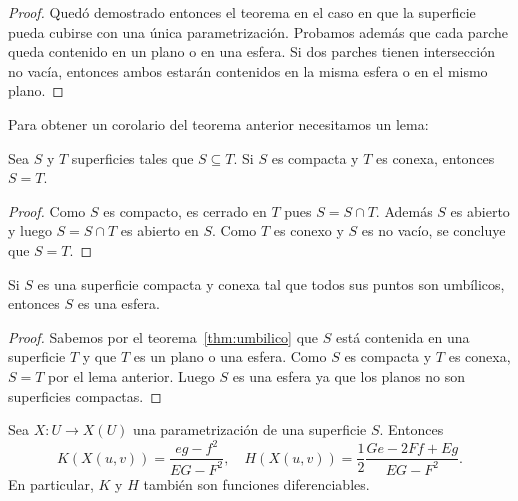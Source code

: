 \begin{proof}
	Quedó demostrado entonces el teorema en el caso en que la superficie pueda
	cubirse con una única parametrización. Probamos además que cada parche
	queda contenido en un plano o en una esfera. Si dos parches tienen
	intersección no vacía, entonces ambos estarán contenidos en la misma esfera
	o en el mismo plano. 
\end{proof}

Para obtener un corolario del teorema anterior
necesitamos un lema:

\begin{lemma}
	Sea $S$ y $T$ superficies tales que $S\subseteq T$. Si $S$ es compacta y
	$T$ es conexa, entonces $S=T$.
\end{lemma}

\begin{proof} 
	Como $S$ es compacto, es cerrado en $T$ pues $S=S\cap T$. Además
	$S$ es abierto y luego $S=S\cap T$ es abierto en $S$. Como $T$ es conexo y
	$S$ es no vacío, se concluye que $S=T$.
\end{proof}

\begin{theorem}
	\label{thm:es_esfera}
	Si $S$ es una superficie compacta y conexa tal que todos sus puntos son
	umbílicos, entonces $S$ es una esfera.	
\end{theorem}

\begin{proof}
	Sabemos por el teorema~\ref{thm:umbilico} que $S$ está contenida en una
	superficie $T$ y que $T$ es un plano o una esfera. Como $S$ es compacta y
	$T$ es conexa, $S=T$ por el lema anterior.  Luego $S$ es una esfera ya que
	los planos no son superficies compactas.
\end{proof}

\begin{proposition}
	Sea $X\colon U\to X(U)$ una parametrización de una superficie $S$. 
	Entonces 
	\[
		K(X(u,v))=\frac{eg-f^2}{EG-F^2},\quad
		H(X(u,v))=\frac{1}{2}\frac{Ge-2Ff+Eg}{EG-F^2}.
	\]
	En particular, $K$ y $H$ también son funciones
	diferenciables. 
\end{proposition}

